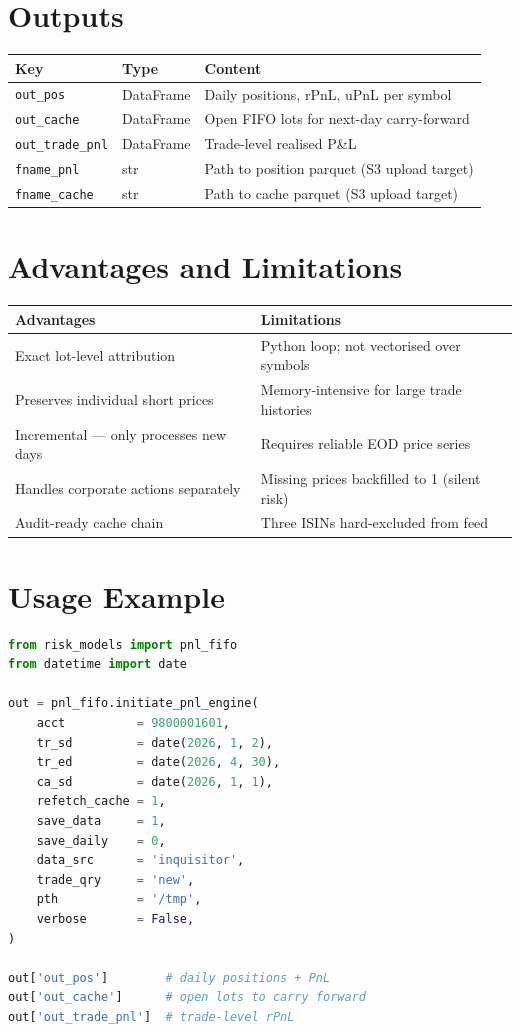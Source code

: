 \documentclass[11pt, a4paper]{article}
\begin{document}
\section{Outputs}

\begin{tabular}{lll}
\toprule
Key & Type & Content \\
\midrule
\texttt{out\_pos}        & DataFrame & Daily positions, rPnL, uPnL per symbol \\
\texttt{out\_cache}      & DataFrame & Open FIFO lots for next-day carry-forward \\
\texttt{out\_trade\_pnl} & DataFrame & Trade-level realised P\&L \\
\texttt{fname\_pnl}      & str       & Path to position parquet (S3 upload target) \\
\texttt{fname\_cache}    & str       & Path to cache parquet (S3 upload target) \\
\bottomrule
\end{tabular}

\section{Advantages and Limitations}

\begin{tabular}{p{7cm} p{7cm}}
\toprule
Advantages & Limitations \\
\midrule
Exact lot-level attribution & Python loop; not vectorised over symbols \\
Preserves individual short prices & Memory-intensive for large trade histories \\
Incremental — only processes new days & Requires reliable EOD price series \\
Handles corporate actions separately & Missing prices backfilled to 1 (silent risk) \\
Audit-ready cache chain & Three ISINs hard-excluded from feed \\
\bottomrule
\end{tabular}

\section{Usage Example}

\begin{lstlisting}[language=Python]
from risk_models import pnl_fifo
from datetime import date

out = pnl_fifo.initiate_pnl_engine(
    acct          = 9800001601,
    tr_sd         = date(2026, 1, 2),
    tr_ed         = date(2026, 4, 30),
    ca_sd         = date(2026, 1, 1),
    refetch_cache = 1,
    save_data     = 1,
    save_daily    = 0,
    data_src      = 'inquisitor',
    trade_qry     = 'new',
    pth           = '/tmp',
    verbose       = False,
)

out['out_pos']        # daily positions + PnL
out['out_cache']      # open lots to carry forward
out['out_trade_pnl']  # trade-level rPnL
\end{lstlisting}
\end{document}
